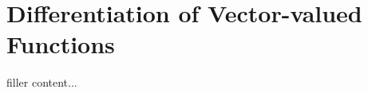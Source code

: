 \documentclass[../../templates/section]{subfiles}
\begin{document}
\section{Differentiation of Vector-valued Functions}\label{sec:differentiation-of-vector-valued-functions}

filler content...
\end{document}
